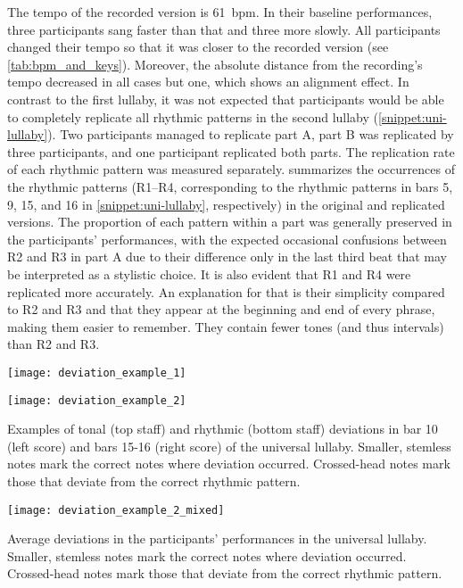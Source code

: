 %
The tempo of the recorded version is \SI{61}{\ac{bpm}}.
In their baseline performances, three participants sang faster than that and three more slowly.
All participants changed their tempo so that it was closer to the recorded version (see \cref{tab:bpm_and_keys}).
Moreover, the absolute distance from the recording's tempo decreased in all cases but one, which shows an alignment effect.
In contrast to the first lullaby, it was not expected that participants would be able to completely replicate all rhythmic patterns in the second lullaby (\cref{snippet:uni-lullaby}).
Two participants managed to replicate part A, part B was replicated by three participants, and one participant replicated both parts.
The replication rate of each rhythmic pattern was measured separately.
 summarizes the occurrences of the rhythmic patterns (R1--R4, corresponding to the rhythmic patterns in bars 5, 9, 15, and 16 in \cref{snippet:uni-lullaby}, respectively) in the original and replicated versions.
The proportion of each pattern within a part was generally preserved in the participants' performances, with the expected occasional confusions between R2 and R3 in part A due to their difference only in the last third beat that may be interpreted as a stylistic choice.
It is also evident that R1 and R4 were replicated more accurately.
An explanation for that is their simplicity compared to R2 and R3 and that they appear at the beginning and end of every phrase, making them easier to remember.
They contain fewer tones (and thus intervals) than R2 and R3.
%
\begin{snippet}[t]
	\begin{minipage}{.41\linewidth}
		\centering
		\texttt{[image: deviation\_example\_1]}
	\end{minipage}%
	\hfill
	\begin{minipage}{.49\linewidth}
		\centering
		\texttt{[image: deviation\_example\_2]}
	\end{minipage}%
	\caption[Examples of tonal and rhythmic deviations]
		{Examples of tonal (top staff) and rhythmic (bottom staff) deviations in bar 10 (left score) and bars 15-16 (right score) of the universal lullaby.
		Smaller, stemless notes mark the correct notes where deviation occurred.
		Crossed-head notes mark those that deviate from the correct rhythmic pattern.}
	\label{snippet:deviation_examples}
\end{snippet}
%
\begin{snippet}[H]
	\centering
	\texttt{[image: deviation\_example\_2\_mixed]}
	\caption[Average tonal and rhythmic deviations]
		{Average deviations in the participants' performances in the universal lullaby.
		Smaller, stemless notes mark the correct notes where deviation occurred.
		Crossed-head notes mark those that deviate from the correct rhythmic pattern.}
	\label{snippet:deviation_example}
\end{snippet}


